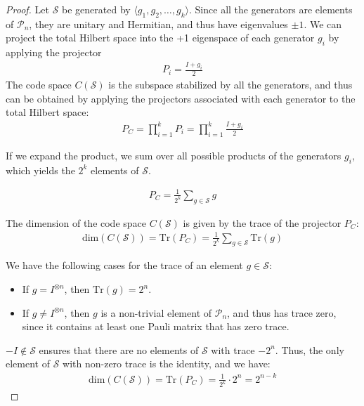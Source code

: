 \documentclass[12pt, twoside, openany]{book}
\begin{document}
\begin{proof}
Let $\mathcal{S}$ be generated by $\langle g_1, g_2, \ldots, g_k \rangle$. Since all the generators are elements of $\mathcal{P}_n$, they are unitary and Hermitian, and thus have eigenvalues $\pm 1$. We can project the total Hilbert space into the +1 eigenspace of each generator $g_i$ by applying the projector
\begin{align*}
    P_i = \frac{I + g_i}{2} 
\end{align*}
The code space $C(\mathcal{S})$ is the subspace stabilized by all the generators, and thus can be obtained by applying the projectors associated with each generator to the total Hilbert space:
\begin{align*}
    P_C = \prod_{i=1}^k P_i = \prod_{i=1}^k \frac{I + g_i}{2} 
\end{align*}

If we expand the product, we sum over all possible products of the generators $g_i$, which yields the $2^k$ elements of $\mathcal{S}$.

\begin{align*}
    P_C = \frac{1}{2^k} \sum_{g \in \mathcal{S}} g    
\end{align*}

The dimension of the code space $C(\mathcal{S})$ is given by the trace of the projector $P_C$:
\begin{align*}
    \text{dim}(C(\mathcal{S})) = \text{Tr}(P_C) = \frac{1}{2^k} \sum_{g \in \mathcal{S}} \text{Tr}(g)
\end{align*}

We have the following cases for the trace of an element $g \in \mathcal{S}$:
\begin{itemize}
    \item If $g = I^{\otimes n}$, then $\text{Tr}(g) = 2^n$.
    \item If $g \neq I^{\otimes n}$, then $g$ is a non-trivial element of $\mathcal{P}_n$, and thus has trace zero, since it contains at least one Pauli matrix that has zero trace.
\end{itemize}

$-I \notin \mathcal{S}$ ensures that there are no elements of $\mathcal{S}$ with trace $-2^n$. Thus, the only element of $\mathcal{S}$ with non-zero trace is the identity, and we have:
\begin{align*}
    \text{dim}(C(\mathcal{S})) = \text{Tr}(P_C) = \frac{1}{2^k} \cdot 2^n = 2^{n-k}
\end{align*}
\end{proof}
\end{document}
